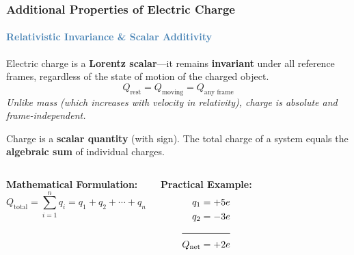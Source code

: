 \begin{frame}
\frametitle{\textsf{\textbf{Additional Properties of Electric Charge}}}
\framesubtitle{\textcolor{steelblue}{Relativistic Invariance \& Scalar Additivity}}

\vspace{-0.1cm}

\begin{keybox}
\vspace{0.1cm}
Electric charge is a \textbf{Lorentz scalar}—it remains \textbf{invariant} under all reference frames, regardless of the state of motion of the charged object.
\begin{equation*}
\boxed{Q_{\text{rest}} = Q_{\text{moving}} = Q_{\text{any frame}}}
\end{equation*}
\vspace{0.05cm}
\textit{Unlike mass (which increases with velocity in relativity), charge is absolute and frame-independent.}
\end{keybox}

\vspace{0.35cm}

\begin{examplebox}
\vspace{0.1cm}
Charge is a \textbf{scalar quantity} (with sign). The total charge of a system equals the \textbf{algebraic sum} of individual charges.

\vspace{0.25cm}

\begin{columns}[T]
    \textbf{Mathematical Formulation:}
    \begin{equation*}
    \boxed{Q_{\text{total}} = \sum_{i=1}^{n} q_i = q_1 + q_2 + \cdots + q_n}
    \end{equation*}
    
    \textbf{Practical Example:}
    \begin{align*}
    q_1 &= +5e\\
    q_2 &= -3e\\
    \cline{1-2}
    Q_{\text{net}} &= +2e
    \end{align*}
\end{columns}


\end{examplebox}
\end{frame}
